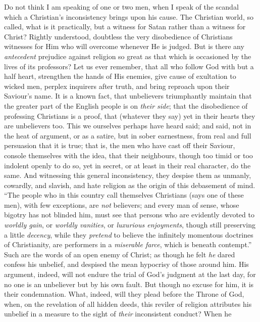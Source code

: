 Do not think I am speaking of one or two men, when I
speak of the scandal which a Christian's inconsistency
brings upon his cause. The Christian world, so called,
what is it practically, but a witness for Satan rather
than a witness for Christ? Rightly understood, doubtless
the very disobedience of Christians witnesses for Him who
will overcome whenever He is judged. But is there any \emph{antecedent}
prejudice against religion so great as that which is
occasioned by the lives of its professors? Let us ever
remember, that all who follow God with but a half heart,
strengthen the hands of His enemies, give cause of
exultation to wicked men, perplex inquirers after truth,
and bring reproach upon their Saviour's name. It is a
known fact, that unbelievers triumphantly maintain that
the greater part of the English people is on \emph{their
side}; that the disobedience of professing Christians
is a proof, that (whatever they say) yet in their hearts
they are unbelievers too. This we ourselves perhaps have
heard said; and said, not in the heat of argument, or as
a satire, but in sober earnestness, from real and full
persuasion that it is true; that is, the men who have
cast off their Saviour, console themselves with the idea,
that their neighbours, though too timid or too indolent
openly to do so, yet in secret, or at least in their real
character, do the same. And witnessing this general
inconsistency, they despise them as unmanly, cowardly,
and slavish, and hate religion as the origin of this
debasement of mind. ``The people who in this country
call themselves Christians (says one of these men), with
few exceptions, are \emph{not} believers; and every man
of sense, whose bigotry has not blinded him, must see
that persons who are evidently devoted to \emph{worldly gain},
or \emph{worldly vanities}, or \emph{luxurious enjoyments},
though still preserving a little \emph{decency}, while
they \emph{pretend} to believe the infinitely momentous
doctrines of Christianity, are performers in a \emph{miserable
farce}, which is beneath contempt.'' Such are the
words of an open enemy of Christ; as though he felt \emph{he}
dared confess his unbelief, and despised the mean
hypocrisy of those around him. His argument, indeed, will
not endure the trial of God's judgment at the last day,
for no one is an unbeliever but by his own fault. But
though no excuse for him, it is their condemnation. What,
indeed, will they plead before the Throne of God, when,
on the revelation of all hidden deeds, this reviler of
religion attributes his unbelief in a measure to the
sight of \emph{their} inconsistent conduct? When he
